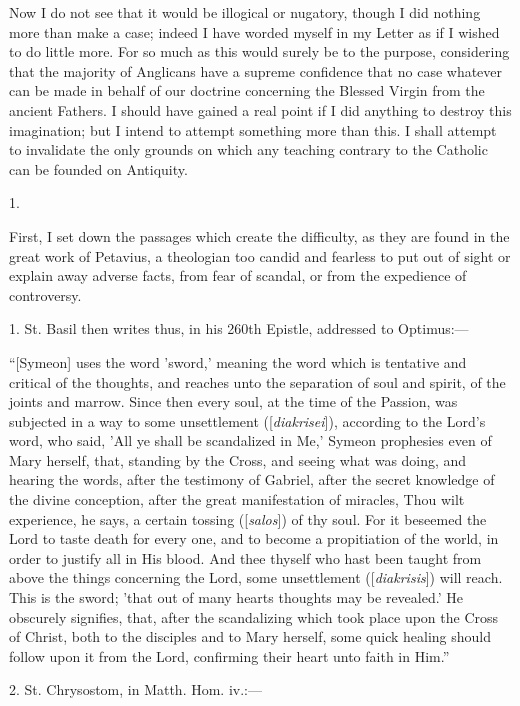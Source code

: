 Now I do not see that it would be illogical or nugatory, though I did
nothing more than make a case; indeed I have worded myself in my
Letter as if I wished to do little more. For so much as this would
surely be to the purpose, considering that the majority of Anglicans
have a supreme confidence that no case whatever can be made in behalf of
our doctrine concerning the Blessed Virgin from the ancient Fathers. I
should have gained a real point if I did anything to destroy this
imagination; but I intend to attempt something more than this. I shall
attempt to invalidate the only grounds on which any teaching contrary to
the Catholic can be founded on Antiquity.


1.


First, I set down the passages which create the difficulty, as they
are found in the great work of Petavius, a theologian too candid and
fearless to put out of sight or explain away adverse facts, from fear of
scandal, or from the expedience of controversy.


1. St. Basil then writes thus, in his 260th Epistle, addressed to
Optimus:—


``[Symeon] uses the word 'sword,' meaning the word which is
tentative and critical of the thoughts, and reaches unto the separation
of soul and spirit, of the joints and marrow. Since then every soul, at
the time of the Passion, was subjected in a way to some unsettlement ([\emph{diakrisei}]),
according to the Lord's word, who said, 'All ye shall be scandalized in
Me,' Symeon prophesies even of Mary herself, that, standing by the
Cross, and seeing what was doing, and hearing the words, after the
testimony of Gabriel, after the secret knowledge of the divine
conception, after the great manifestation of miracles, Thou wilt
experience, he says, a certain tossing ([\emph{salos}]) of thy
soul. For it beseemed the Lord to taste death for every one, and to
become a propitiation of the world, in order to justify all in His
blood. And thee thyself who hast been taught from above the things
concerning the Lord, some unsettlement ([\emph{diakrisis}]) will reach.
This is the sword; 'that out of many hearts thoughts may be revealed.'
He obscurely signifies, that, after the scandalizing which took place
upon the Cross of Christ, both to the disciples and to Mary herself,
some quick healing should follow upon it from the Lord, confirming their
heart unto faith in Him.''


2. St. Chrysostom, in Matth. Hom. iv.:—



